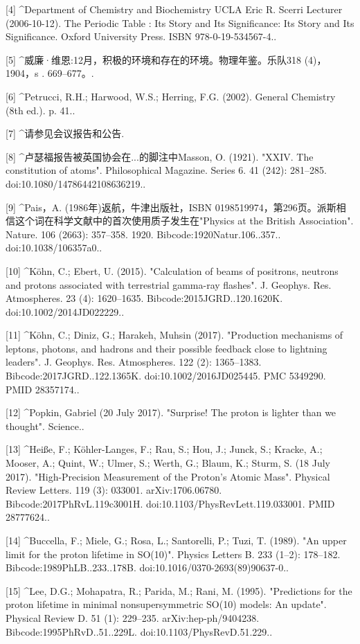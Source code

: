 [4]
^Department of Chemistry and Biochemistry UCLA Eric R. Scerri Lecturer (2006-10-12). The Periodic Table : Its Story and Its Significance: Its Story and Its Significance. Oxford University Press. ISBN 978-0-19-534567-4..

[5]
^威廉·维恩:12月，积极的环境和存在的环境。物理年鉴。乐队318 (4)，1904，s . 669–677。.

[6]
^Petrucci, R.H.; Harwood, W.S.; Herring, F.G. (2002). General Chemistry (8th ed.). p. 41..

[7]
^请参见会议报告和公告.

[8]
^卢瑟福报告被英国协会在...的脚注中Masson, O. (1921). "XXIV. The constitution of atoms". Philosophical Magazine. Series 6. 41 (242): 281–285. doi:10.1080/14786442108636219..

[9]
^Pais，A. (1986年)返航，牛津出版社，ISBN 0198519974，第296页。派斯相信这个词在科学文献中的首次使用质子发生在"Physics at the British Association". Nature. 106 (2663): 357–358. 1920. Bibcode:1920Natur.106..357.. doi:10.1038/106357a0..

[10]
^Köhn, C.; Ebert, U. (2015). "Calculation of beams of positrons, neutrons and protons associated with terrestrial gamma-ray flashes". J. Geophys. Res. Atmospheres. 23 (4): 1620–1635. Bibcode:2015JGRD..120.1620K. doi:10.1002/2014JD022229..

[11]
^Köhn, C.; Diniz, G.; Harakeh, Muhsin (2017). "Production mechanisms of leptons, photons, and hadrons and their possible feedback close to lightning leaders". J. Geophys. Res. Atmospheres. 122 (2): 1365–1383. Bibcode:2017JGRD..122.1365K. doi:10.1002/2016JD025445. PMC 5349290. PMID 28357174..

[12]
^Popkin, Gabriel (20 July 2017). "Surprise! The proton is lighter than we thought". Science..

[13]
^Heiße, F.; Köhler-Langes, F.; Rau, S.; Hou, J.; Junck, S.; Kracke, A.; Mooser, A.; Quint, W.; Ulmer, S.; Werth, G.; Blaum, K.; Sturm, S. (18 July 2017). "High-Precision Measurement of the Proton's Atomic Mass". Physical Review Letters. 119 (3): 033001. arXiv:1706.06780. Bibcode:2017PhRvL.119c3001H. doi:10.1103/PhysRevLett.119.033001. PMID 28777624..

[14]
^Buccella, F.; Miele, G.; Rosa, L.; Santorelli, P.; Tuzi, T. (1989). "An upper limit for the proton lifetime in SO(10)". Physics Letters B. 233 (1–2): 178–182. Bibcode:1989PhLB..233..178B. doi:10.1016/0370-2693(89)90637-0..

[15]
^Lee, D.G.; Mohapatra, R.; Parida, M.; Rani, M. (1995). "Predictions for the proton lifetime in minimal nonsupersymmetric SO(10) models: An update". Physical Review D. 51 (1): 229–235. arXiv:hep-ph/9404238. Bibcode:1995PhRvD..51..229L. doi:10.1103/PhysRevD.51.229..

